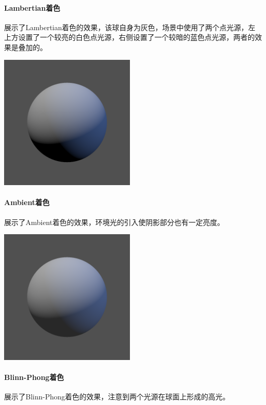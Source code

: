 \paragraph{Lambertian着色}
展示了Lambertian着色的效果，该球自身为灰色，场景中使用了两个点光源，左上方设置了一个较亮的白色点光源，右侧设置了一个较暗的蓝色点光源，两者的效果是叠加的。
\begin{Figure}[Lambertian着色]
    \includegraphics[width=6.5cm]{image/RasterizationIOW/SphereLambertian.png}
\end{Figure}

\paragraph{Ambient着色}
展示了Ambient着色的效果，环境光的引入使阴影部分也有一定亮度。
\begin{Figure}[Ambient着色]
    \includegraphics[width=6.5cm]{image/RasterizationIOW/SphereAmbient.png}
\end{Figure}

\paragraph{Blinn-Phong着色}
展示了Blinn-Phong着色的效果，注意到两个光源在球面上形成的高光。

